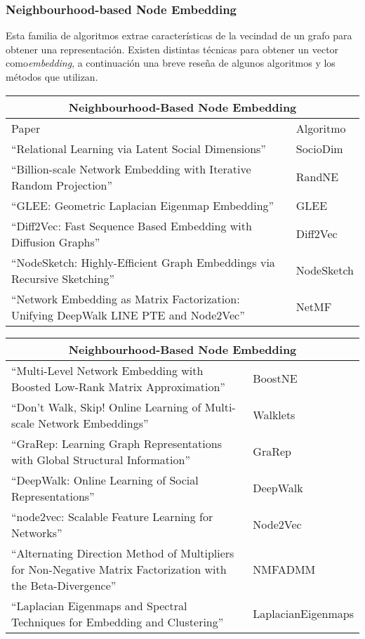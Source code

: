 \subsubsection{Neighbourhood-based Node Embedding}

Esta familia de algoritmos extrae características de la vecindad de un grafo para obtener una representación. Existen distintas técnicas para obtener un vector como\textit{embedding}, a continuación una breve reseña de algunos algoritmos y los métodos que utilizan.

\begin{center}
    \begin{tabular}{ |p{8cm}|p{2cm}|  }
    \hline
    \multicolumn{2}{|c|}{Neighbourhood-Based Node Embedding} \\
    \hline
    Paper & Algoritmo  \\
    \hline
    “Relational Learning via Latent Social Dimensions” & SocioDim \\
    \hline
    “Billion-scale Network Embedding with Iterative Random Projection” & RandNE \\
    \hline
    “GLEE: Geometric Laplacian Eigenmap Embedding” & GLEE \\
    \hline
    “Diff2Vec: Fast Sequence Based Embedding with Diffusion Graphs” & Diff2Vec \\
    \hline
    “NodeSketch: Highly-Efficient Graph Embeddings via Recursive Sketching” & NodeSketch \\
    \hline
    “Network Embedding as Matrix Factorization: Unifying DeepWalk LINE PTE and Node2Vec” & NetMF  \\
    \hline
    \end{tabular}
\end{center}

\begin{center}
    \begin{tabular}{ |p{8cm}|p{2cm}|  }
    \hline
    \multicolumn{2}{|c|}{Neighbourhood-Based Node Embedding} \\
    \hline
    “Multi-Level Network Embedding with Boosted Low-Rank Matrix Approximation” & BoostNE  \\
    \hline
    “Don’t Walk, Skip! Online Learning of Multi-scale Network Embeddings” & Walklets \\
    \hline
    “GraRep: Learning Graph Representations with Global Structural Information” & GraRep \\
    \hline
    “DeepWalk: Online Learning of Social Representations” & DeepWalk \\
    \hline
    “node2vec: Scalable Feature Learning for Networks” & Node2Vec \\
    \hline
    “Alternating Direction Method of Multipliers for Non-Negative Matrix Factorization with the Beta-Divergence” & NMFADMM \\
    \hline
    “Laplacian Eigenmaps and Spectral Techniques for Embedding and Clustering” & LaplacianEigenmaps \\
    \hline
    \end{tabular}
\end{center}


